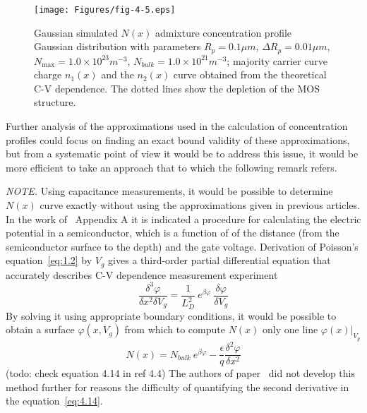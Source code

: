 \begin{figure}[h!]\centering
  \begin{minipage}[c]{\myfiguresize}
    \begin{center}
      \texttt{[image: Figures/fig-4-5.eps]}
      \caption[Gaussian-simulated impurity concentration profile
        distribution]{Gaussian simulated $N(x)$ admixture
        concentration profile Gaussian distribution with parameters
        $R_{p}=0.1\mu m$, $\Delta R_{p}=0.01\mu m$,
        $N_{\max}=1.0\times10^{23}m^{-3}$,
        $N_{bulk}=1.0\times10^{21}m^{-3}$; majority carrier curve
        charge $n_{1}(x)$ and the $n_{2}(x)$ curve obtained from the
        theoretical C-V dependence. The dotted lines show the
        depletion of the MOS structure.}\label{fig:4.5}
    \end{center}
  \end{minipage}
\end{figure}

\par Further analysis of the approximations used in the calculation of
concentration profiles could focus on finding an exact bound validity
of these approximations, but from a systematic point of view it would
be to address this issue, it would be more efficient to take an
approach that to which the following remark refers.

\begin{minipage}[c]{\textwidth}
  \emph{NOTE.} Using capacitance measurements, it would be possible
  to determine $N(x)$ curve exactly without using the
  approximations given in previous articles.  In the work
  of~\cite{4.4} Appendix A it is indicated a procedure for calculating
  the electric potential in a semiconductor, which is a function of of
  the distance (from the semiconductor surface to the depth) and the
  gate voltage. Derivation of Poisson's equation~\ref{eq:1.2} by
  $V_{g}$ gives a third-order partial differential equation that
  accurately describes C-V dependence measurement experiment
  \begin{equation}\label{eq:4.13}
    \frac{\delta^{3}\varphi}{\delta x^{2}\delta V_{g}} = {\frac{1}{L_{D}^{2}}}\ {e^{\beta\varphi}}\ {\frac{\delta\varphi}{\delta V_{g}}}
  \end{equation}
  By solving it using appropriate boundary conditions, it would be
  possible to obtain a surface $\varphi(x,V_{g})$ from which to
  compute $N(x)$ only one line $\varphi(x)\rvert_{V_{g}}$
  \begin{equation}\label{eq:4.14}
    N(x) = N_{bulk}\ e^{\beta\varphi}-\frac{\epsilon}{q}\frac{\delta^{2}\varphi}{\delta x^{2}}
  \end{equation}
  (todo: check equation 4.14 in ref 4.4)
  The authors of paper~\cite{4.4} did not develop this method further
  for reasons the difficulty of quantifying the second derivative in
  the equation~\ref{eq:4.14}.
\end{minipage}

